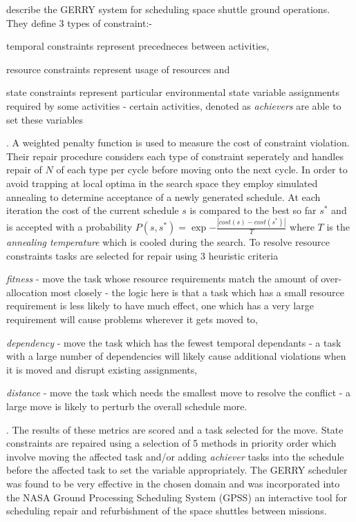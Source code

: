 \cite{zweben94scheduling} describe the GERRY system for scheduling space shuttle ground operations. They define 3 types of constraint:- \begin{inparaenum} \item temporal constraints represent precedneces between activities, \item resource constraints represent usage of resources and \item state constraints represent particular environmental state variable assignments required by some activities - certain activities, denoted as \emph{achievers} are able to set these variables \end{inparaenum}. A weighted penalty function is used to measure the cost of constraint violation. Their repair procedure considers each type of constraint seperately and handles repair of $N$ of each type per cycle before moving onto the next cycle. In order to avoid trapping at local optima in the search space they employ simulated annealing to determine acceptance of a newly generated schedule. At each iteration the cost of the current schedule $s$ is compared to the best so far $s^*$ and is accepted with a probability $P(s,s^*) = \exp{-\frac{|cost(s)-cost(s^*)|}{T}}$ where $T$ is the \emph{annealing temperature} which is cooled during the search. To resolve resource constraints tasks are selected for repair using 3 heuristic criteria \begin{inparaenum} \item \emph{fitness} - move the task whose resource requirements match the amount of over-allocation most closely - the logic here is that a task which has a small resource requirement is less likely to have much effect, one which has a very large requirement will cause problems wherever it gets moved to, \item \emph{dependency} - move the task which has the fewest temporal dependants - a task with a large number of dependencies will likely cause additional violations when it is moved and disrupt existing assignments, \item \emph{distance} - move the task which needs the smallest move to resolve the conflict - a large move is likely to perturb the overall schedule more. \end{inparaenum}. The results of these metrics are scored and a task selected for the move. State constraints are repaired using a selection of 5 methods in priority order which involve moving the affected task and/or adding \emph{achiever} tasks into the schedule before the affected task to set the variable appropriately. The GERRY scheduler was found to be very effective in the chosen domain and was incorporated into the NASA Ground Processing Scheduling System (GPSS) an interactive tool for scheduling repair and refurbishment of the space shuttles between missions. 


